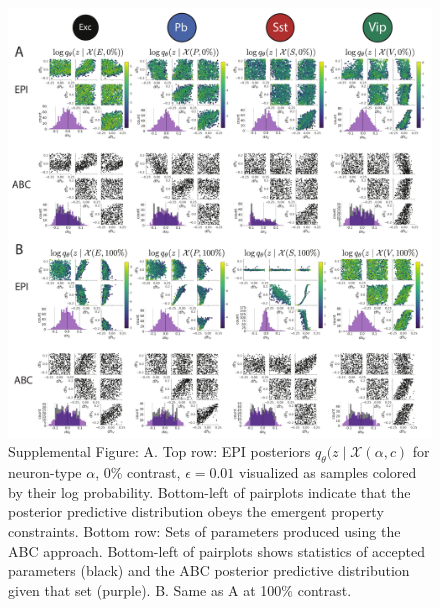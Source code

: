 \documentclass[11pt]{article}
\begin{document}
\begin{figure}[h]
\caption{\small Supplemental Figure: A. Top row: EPI posteriors $q_\theta(z \mid \mathcal{X}(\alpha, c)$ for neuron-type $\alpha$, 0\% contrast, $\epsilon=0.01$ visualized as samples colored by their log probability.  Bottom-left of pairplots indicate that the posterior predictive distribution obeys the emergent property constraints.  
Bottom row: Sets of parameters produced using the ABC approach.  Bottom-left of pairplots shows statistics of accepted parameters (black) and the ABC posterior predictive distribution given that set (purple).
B. Same as A at 100\% contrast.
 }\label{fig:SX1}
\begin{center}
\includegraphics[scale=.5]{figs/FigSX/Fig_SX1.pdf}
\end{center}
\end{figure}
\end{document}
